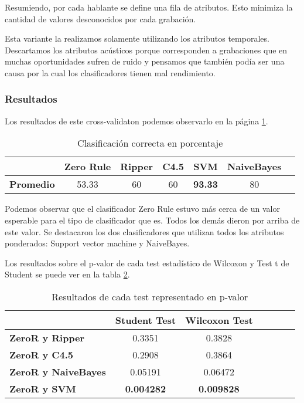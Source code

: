 Resumiendo, por cada hablante se define una fila de atributos. Esto minimiza la cantidad de valores desconocidos por cada grabación.

Esta variante la realizamos solamente utilizando los atributos temporales. Descartamos los atributos acústicos porque corresponden a grabaciones que en muchas oportunidades sufren de ruido y pensamos que también podía ser una causa por la cual los clasificadores tienen mal rendimiento.

\subsubsection{Resultados}

Los resultados de este cross-validaton podemos observarlo en la página \ref{PAH_class_corr_en_pct}.

\begin{table}[H]
	\centering
	\begin{tabular}{|l|c|c|c|c|c|c|}
		\hline
		\textbf{}  & \textbf{Zero Rule} & \textbf{Ripper} & \textbf{C4.5} & \textbf{SVM} & \textbf{NaiveBayes} \\ \hline
		\textbf{Promedio} & 53.33 & 60 & 60 & \textbf{93.33} & 80  \\ \hline
	\end{tabular}
	\caption{Clasificación correcta en porcentaje}
	\label{PAH_class_corr_en_pct}
\end{table}

Podemos observar que el clasificador Zero Rule estuvo más cerca de un valor esperable para el tipo de clasificador que es. Todos los demás dieron por arriba de este valor. Se destacaron los dos clasificadores que utilizan todos los atributos ponderados: Support vector machine y NaiveBayes.

Los resultados sobre el p-valor de cada test estadístico de Wilcoxon y Test t de Student se puede ver en la tabla \ref{PAH_res_tests_wilcoxon_student}.

\begin{table}[H]
	\centering
	\begin{tabular}{|l|c|c|c|c|c|c|}
		\hline
		\textbf{}  & \textbf{Student Test} & \textbf{Wilcoxon Test} \\ \hline		
			\textbf{ZeroR y Ripper}  & 0.3351 & 0.3828 \\ \hline
			\textbf{ZeroR y C4.5}  & 0.2908 &  0.3864 \\ \hline
			\textbf{ZeroR y NaiveBayes}  & 0.05191 & 0.06472 \\ \hline
			\textbf{ZeroR y SVM}  &  \textbf{0.004282} & \textbf{0.009828} \\ \hline
	\end{tabular}
	\caption{Resultados de cada test representado en p-valor}
	\label{PAH_res_tests_wilcoxon_student}
\end{table}

